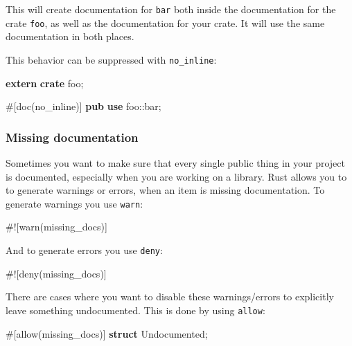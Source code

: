 \documentclass[a4paper,]{book}
\newenvironment{Shaded}{\begin{snugshade}}{\end{snugshade}}
\newcommand{\KeywordTok}[1]{\textcolor[rgb]{0.13,0.29,0.53}{\textbf{{#1}}}}
\newcommand{\AttributeTok}[1]{\textcolor[rgb]{0.77,0.63,0.00}{{#1}}}
\newcommand{\NormalTok}[1]{{#1}}
\begin{document}
This will create documentation for \texttt{bar} both inside the
documentation for the crate \texttt{foo}, as well as the documentation
for your crate. It will use the same documentation in both places.

This behavior can be suppressed with \texttt{no\_inline}:

\begin{Shaded}
\begin{Highlighting}[]
\KeywordTok{extern} \KeywordTok{crate} \NormalTok{foo;}

\AttributeTok{#[}\NormalTok{doc}\AttributeTok{(}\NormalTok{no_inline}\AttributeTok{)]}
\KeywordTok{pub} \KeywordTok{use} \NormalTok{foo::bar;}
\end{Highlighting}
\end{Shaded}

\subsubsection{Missing documentation}\label{missing-documentation}

Sometimes you want to make sure that every single public thing in your
project is documented, especially when you are working on a library.
Rust allows you to to generate warnings or errors, when an item is
missing documentation. To generate warnings you use \texttt{warn}:

\begin{Shaded}
\begin{Highlighting}[]
\AttributeTok{#![}\NormalTok{warn}\AttributeTok{(}\NormalTok{missing_docs}\AttributeTok{)]}
\end{Highlighting}
\end{Shaded}

And to generate errors you use \texttt{deny}:

\begin{Shaded}
\begin{Highlighting}[]
\AttributeTok{#![}\NormalTok{deny}\AttributeTok{(}\NormalTok{missing_docs}\AttributeTok{)]}
\end{Highlighting}
\end{Shaded}

There are cases where you want to disable these warnings/errors to
explicitly leave something undocumented. This is done by using
\texttt{allow}:

\begin{Shaded}
\begin{Highlighting}[]
\AttributeTok{#[}\NormalTok{allow}\AttributeTok{(}\NormalTok{missing_docs}\AttributeTok{)]}
\KeywordTok{struct} \NormalTok{Undocumented;}
\end{Highlighting}
\end{Shaded}
\end{document}
